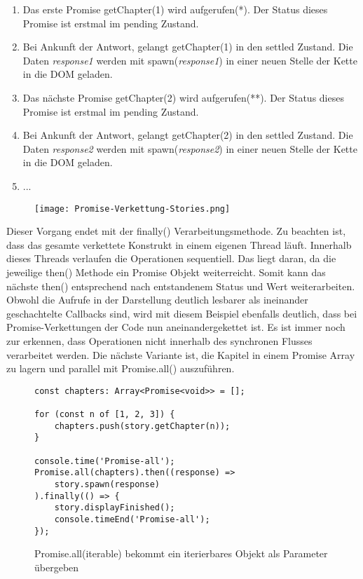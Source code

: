 \begin{enumerate}
    \item Das erste Promise getChapter(1) wird aufgerufen(*). Der Status dieses Promise ist erstmal im pending Zustand.
    \item Bei Ankunft der Antwort, gelangt getChapter(1) in den settled Zustand. Die Daten \textit{response1} werden mit spawn(\textit{response1}) in einer neuen Stelle der Kette in die DOM geladen.
    \item Das nächste Promise getChapter(2) wird aufgerufen(**). Der Status dieses Promise ist erstmal im pending Zustand. 
    \item Bei Ankunft der Antwort, gelangt getChapter(2) in den settled Zustand. Die Daten \textit{response2} werden mit spawn(\textit{response2}) in einer neuen Stelle der Kette in die DOM geladen.
    \item ...
\end{enumerate}

\begin{figure}[H]
\centering
\texttt{[image: Promise-Verkettung-Stories.png]}
\end{figure}

\noindent
Dieser Vorgang endet mit der finally() Verarbeitungsmethode. Zu beachten ist, dass das gesamte verkettete Konstrukt in einem eigenen Thread läuft. Innerhalb dieses Threads verlaufen die Operationen sequentiell. Das liegt daran, da die jeweilige then() Methode ein Promise Objekt weiterreicht. Somit kann das nächste then() entsprechend nach entstandenem Status und Wert weiterarbeiten. Obwohl die Aufrufe in der Darstellung deutlich lesbarer als ineinander geschachtelte Callbacks sind, wird mit diesem Beispiel ebenfalls deutlich, dass bei Promise-Verkettungen der Code nun aneinandergekettet ist. Es ist immer noch zur erkennen, dass Operationen nicht innerhalb des synchronen Flusses verarbeitet werden. Die nächste Variante ist, die Kapitel in einem Promise Array zu lagern und parallel mit Promise.all() auszuführen.

\begin{figure}[H]
\begin{lstlisting}[basicstyle=\small]
const chapters: Array<Promise<void>> = [];

for (const n of [1, 2, 3]) {
    chapters.push(story.getChapter(n));
}

console.time('Promise-all');
Promise.all(chapters).then((response) =>
    story.spawn(response)
).finally(() => {
    story.displayFinished();
    console.timeEnd('Promise-all');
});
\end{lstlisting}
\caption{Promise.all(iterable) bekommt ein iterierbares Objekt als Parameter übergeben}
\label{Promise-all-example}
\end{figure}

